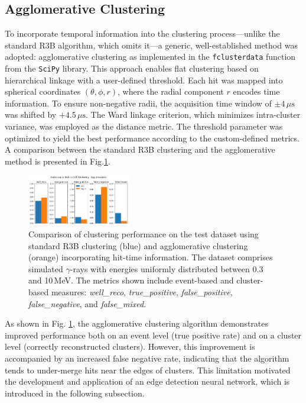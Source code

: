 \documentclass[final,5p,times,twocolumn]{elsarticle}
\begin{document}
\subsection{Agglomerative Clustering}\label{s_sec:agglo}
To incorporate temporal information into the clustering process---unlike the standard R3B algorithm, which omits it---a generic, well-established method was adopted: agglomerative clustering as implemented in the \texttt{fclusterdata} function from the \texttt{SciPy} library. This approach enables flat clustering based on hierarchical linkage with a user-defined threshold.\newline
Each hit was mapped into spherical coordinates \((\theta, \phi, r)\), where the radial component \(r\) encodes time information. To ensure non-negative radii, the acquisition time window of \(\pm 4\,\mu\mathrm{s}\) was shifted by \(+4.5\,\mu\mathrm{s}\). The Ward linkage criterion, which minimizes intra-cluster variance, was employed as the distance metric.\newline
The threshold parameter was optimized to yield the best performance according to the custom-defined metrics. A comparison between the standard R3B clustering and the agglomerative method is presented in Fig.\ref{fig:r3b_agglo_metrics}.
\begin{figure}[!htb]
	\centering 
	\includegraphics[width=0.4\textwidth]{r3b_vs_agglo_metrics.png}	
	\caption{Comparison of clustering performance on the test dataset using standard R3B clustering (blue) and agglomerative clustering (orange) incorporating hit-time information. The dataset comprises simulated $\gamma$-rays with energies uniformly distributed between 0.3 and 10\,MeV. The metrics shown include event-based and cluster-based measures: \textit{well\_reco}, \textit{true\_positive}, \textit{false\_positive}, \textit{false\_negative}, and \textit{false\_mixed}.} 
	\label{fig:r3b_agglo_metrics}%
\end{figure}
As shown in Fig. \ref{fig:r3b_agglo_metrics}, the agglomerative clustering algorithm demonstrates improved performance both on an event level (true positive rate) and on a cluster level (correctly reconstructed clusters). However, this improvement is accompanied by an increased false negative rate, indicating that the algorithm tends to under-merge hits near the edges of clusters. This limitation motivated the development and application of an edge detection neural network, which is introduced in the following subsection.
\end{document}
